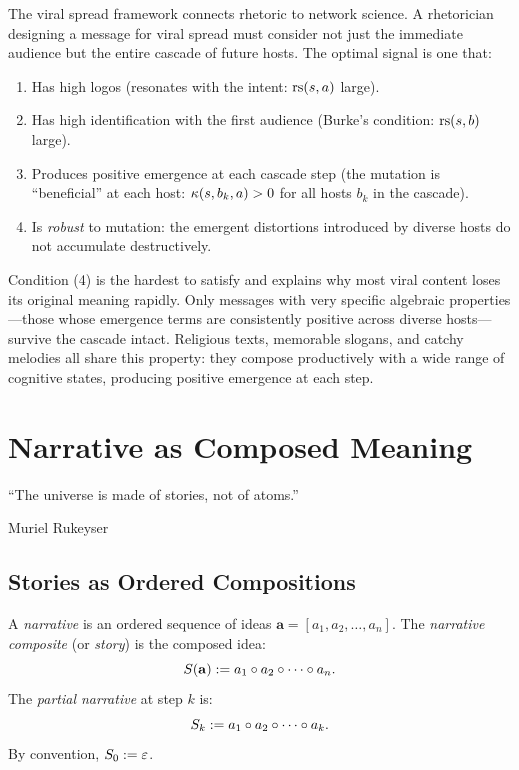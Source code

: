 \begin{interpretation}
\label{interp:rhetoric-network}
The viral spread framework connects rhetoric to network science.  A
rhetorician designing a message for viral spread must consider not just
the immediate audience but the entire cascade of future hosts.  The
optimal signal is one that:
\begin{enumerate}
  \item Has high logos (resonates with the intent: $\mathrm{rs}(s, a)$ large).
  \item Has high identification with the first audience (Burke's
        condition: $\mathrm{rs}(s, b)$ large).
  \item Produces positive emergence at each cascade step (the mutation
        is ``beneficial'' at each host: $\kappa(s, b_k, a) > 0$ for
        all hosts $b_k$ in the cascade).
  \item Is \emph{robust} to mutation: the emergent distortions introduced
        by diverse hosts do not accumulate destructively.
\end{enumerate}

Condition (4) is the hardest to satisfy and explains why most viral content
loses its original meaning rapidly.  Only messages with very specific
algebraic properties---those whose emergence terms are consistently positive
across diverse hosts---survive the cascade intact.  Religious texts,
memorable slogans, and catchy melodies all share this property: they compose
productively with a wide range of cognitive states, producing positive
emergence at each step.
\end{interpretation}


\chapter{Narrative as Composed Meaning}
\label{ch:narrative-deep}

\epigraph{``The universe is made of stories, not of atoms.''}%
{Muriel Rukeyser}


\section{Stories as Ordered Compositions}

\begin{definition}[Narrative]
\label{def:narrative}
A \emph{narrative} is an ordered sequence of ideas
$\mathbf{a} = [a_1, a_2, \ldots, a_n]$.  The \emph{narrative composite}
(or \emph{story}) is the composed idea:
\[
  S(\mathbf{a}) := a_1 \circ a_2 \circ \cdots \circ a_n.
\]
The \emph{partial narrative} at step $k$ is:
\[
  S_k := a_1 \circ a_2 \circ \cdots \circ a_k.
\]
By convention, $S_0 := \varepsilon$.
\end{definition}


